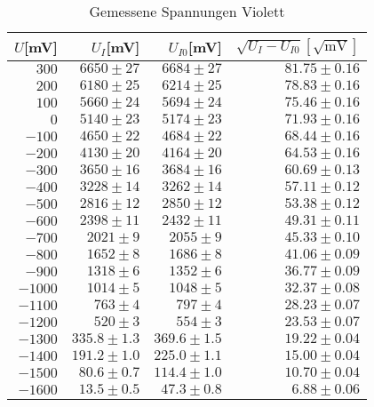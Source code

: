 \begin{table}[h]
  \centering
  \caption{Gemessene Spannungen Violett}
    \begin{tabular}{r | r | r | r}
    \toprule
    $U$[mV] & $U_I$[mV] & $U_{I0}$[mV] & $\sqrt{U_I  - U_{I0}}[\sqrt{\text{mV}}]$\\
    \midrule
    $300 $  & $6650 \pm 27$ & $6684 \pm  27$ & $81.75 \pm  0.16$ \\
    $200$   &$ 6180 \pm 25$ &$ 6214 \pm  25$ & $78.83 \pm  0.16$ \\
    $100$   & $5660\pm  24$ & $5694 \pm  24$ & $75.46 \pm  0.16$ \\
    $0$     & $5140\pm  23$ & $5174 \pm  23$ & $71.93 \pm  0.16$ \\
    $-100$  & $4650 \pm  22$ & $4684 \pm 22$ &$ 68.44 \pm  0.16$\\
    $-200 $ & $4130\pm  20 $& $4164 \pm  20$ & $64.53 \pm  0.16$ \\
    $-300$  & $3650\pm  16$ & $3684 \pm  16$ & $60.69\pm  0.13 $\\
    $-400$  & $3228\pm  14$ & $3262 \pm  14$ &$ 57.11 \pm  0.12$ \\
   $ -500$  & $2816\pm  12$ & $2850 \pm  12$ & $53.38 \pm  0.12 $\\
    $-600$  & $2398\pm  11$ & $2432 \pm  11$ & $49.31 \pm  0.11$ \\
    $-700$  & $2021\pm  9$ & $2055 \pm  9$ & $45.33 \pm  0.10 $\\
    $-800$  & $1652\pm  8$ & $1686 \pm  8$ & $41.06 \pm  0.09$ \\
    $-900$  & $1318\pm  6$ & $1352 \pm  6$ & $36.77 \pm  0.09$ \\
    $-1000 $& $1014\pm  5$ & $1048 \pm  5$ & $32.37\pm  0.08$\\
    $-1100$ & $763\pm  4$ & $797 \pm  4$ & $28.23 \pm  0.07$ \\
   $ -1200$ & $520\pm  3$  & $554 \pm  3$ & $23.53 \pm  0.07$ \\
    $-1300$ & $335.8 \pm  1.3$ & $369.6 \pm  1.5$ & $19.22 \pm  0.04$ \\
    $-1400$ & $191.2 \pm  1.0$ & $225.0 \pm  1.1$& $15.00 \pm  0.04$ \\
    $-1500$ & $80.6  \pm  0.7$ & $114.4 \pm  1.0$ & $10.70 \pm  0.04$ \\
    $-1600$ & $13.5  \pm  0.5$ & $47.3  \pm  0.8 $&$ 6.88 \pm  0.06$\\
    \bottomrule
    \end{tabular}
    
\end{table}%


